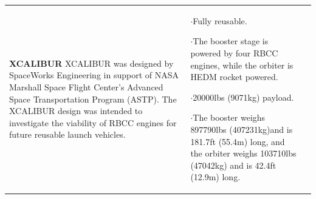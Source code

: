 {\begin{landscape}
\begin{xltabular}{\linewidth}{|X|X|X|}
	\hline \small 
	\textbf{XCALIBUR}\cite{Bradford2002}\newline\newline
	XCALIBUR was designed by SpaceWorks Engineering in support of NASA Marshall Space Flight Center’s Advanced Space Transportation Program (ASTP). The XCALIBUR design was intended to investigate the viability of RBCC engines for future reusable launch vehicles. 
	&\small
	
	$\cdot$Fully reusable. 
	
	$\cdot$The booster stage is powered by four RBCC engines, while the orbiter is HEDM rocket powered. 
	
	$\cdot$20000lbs (9071kg) payload.
	
	$\cdot$The booster weighs 897790lbs (407231kg)and is 181.7ft (55.4m) long, and the orbiter weighs 103710lbs (47042kg) and is 42.4ft (12.9m) long.  
	

\end{xltabular}
\end{landscape}}
